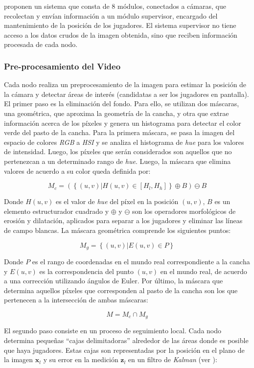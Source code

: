 \citeauthor*{xu-8cams} proponen un sistema que consta de 8 módulos, conectados
a cámaras, que recolectan y envían información
a un módulo supervisor, encargado del mantenimiento de la posición de los
jugadores. El sistema supervisor no tiene acceso a los datos crudos de la
imagen obtenida, sino que reciben información procesada de cada nodo.

\subsubsection{Pre-procesamiento del Video}

Cada nodo realiza un preprocesamiento de la imagen para estimar la posición
de la cámara y detectar áreas de interés (candidatas a ser los jugadores en
pantalla). El primer paso es la eliminación del fondo. Para ello, se utilizan dos máscaras,
una geométrica, que aproxima la geometría de la cancha, y otra que extrae
información acerca de los píxeles y genera un histograma para detectar el color
verde del pasto de la cancha. Para la primera máscara, se pasa la imagen del
espacio de colores
\textit{RGB} a \textit{HSI} y se analiza el histograma de \textit{hue} para los
valores de intensidad. Luego, los píxeles que serán considerados son
aquellos que no pertenezcan a un determinado rango de \textit{hue}.
Luego, la máscara que elimina valores de acuerdo a su color queda definida por:

\[
  M_c = (\left\{(u, v) | H(u, v) \in [H_l, H_h]\right\} \oplus B ) \ominus B
\]

Donde $H(u, v)$ es el valor de \textit{hue} del píxel en la posición $(u, v)$,
$B$ es un elemento estructurador cuadrado y $\oplus$ y $\ominus$ son los
operadores morfológicos de erosión y dilatación, aplicados para separar a los
jugadores y eliminar las líneas de campo blancas. La máscara geométrica
comprende los siguientes puntos:

\[
  M_g = \left\{ (u, v) | E(u, v)  \in P \right\}
\]

Donde $P$ es el rango de coordenadas en el mundo real correspondiente a la cancha
y $E(u, v)$ es la correspondencia del punto $(u, v)$ en el mundo real, de
acuerdo a una corrección utilizando ángulos de Euler. Por último, la máscara que
determina aquellos píxeles que corresponden al pasto de la cancha son los que
pertenecen a la intersección de ambas máscaras:

\[
  M = M_c \cap M_g
\]

El segundo paso consiste en un proceso de seguimiento local. Cada nodo
determina pequeñas ``cajas delimitadoras'' alrededor de las áreas donde
es posible que haya jugadores. Estas cajas son
representadas por la posición en el plano de la imagen $\mathbf{x}_l$ y su
error en la medición $\mathbf{z}_l$ en un filtro de \textit{Kalman} (ver \cite{funk2003study}):

